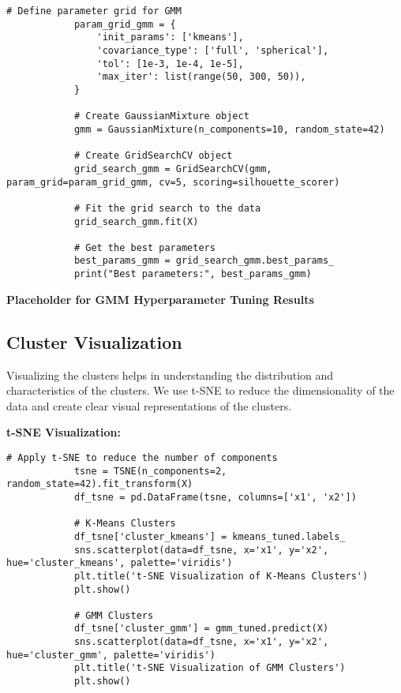         \begin{lstlisting}[caption={Grid Search for Gaussian Mixture Model (GMM)}, label={lst:grid_search_gmm}]
            # Define parameter grid for GMM
            param_grid_gmm = {
                'init_params': ['kmeans'],
                'covariance_type': ['full', 'spherical'],
                'tol': [1e-3, 1e-4, 1e-5],
                'max_iter': list(range(50, 300, 50)),
            }
            
            # Create GaussianMixture object
            gmm = GaussianMixture(n_components=10, random_state=42)
            
            # Create GridSearchCV object
            grid_search_gmm = GridSearchCV(gmm, param_grid=param_grid_gmm, cv=5, scoring=silhouette_scorer)
            
            # Fit the grid search to the data
            grid_search_gmm.fit(X)
            
            # Get the best parameters
            best_params_gmm = grid_search_gmm.best_params_
            print("Best parameters:", best_params_gmm)
        \end{lstlisting}
        
        \vspace{1em}

        \textbf{Placeholder for GMM Hyperparameter Tuning Results}
            
    \subsection{Cluster Visualization}
    
        Visualizing the clusters helps in understanding the distribution and characteristics of the clusters. We use t-SNE to reduce the dimensionality of the data and create clear visual representations of the clusters.

        \textbf{t-SNE Visualization:}

        \begin{lstlisting}[caption={t-SNE Visualization of Clusters}, label={lst:tsne_visualization}]
            # Apply t-SNE to reduce the number of components
            tsne = TSNE(n_components=2, random_state=42).fit_transform(X)
            df_tsne = pd.DataFrame(tsne, columns=['x1', 'x2'])
            
            # K-Means Clusters
            df_tsne['cluster_kmeans'] = kmeans_tuned.labels_
            sns.scatterplot(data=df_tsne, x='x1', y='x2', hue='cluster_kmeans', palette='viridis')
            plt.title('t-SNE Visualization of K-Means Clusters')
            plt.show()
            
            # GMM Clusters
            df_tsne['cluster_gmm'] = gmm_tuned.predict(X)
            sns.scatterplot(data=df_tsne, x='x1', y='x2', hue='cluster_gmm', palette='viridis')
            plt.title('t-SNE Visualization of GMM Clusters')
            plt.show()
        \end{lstlisting}
        
